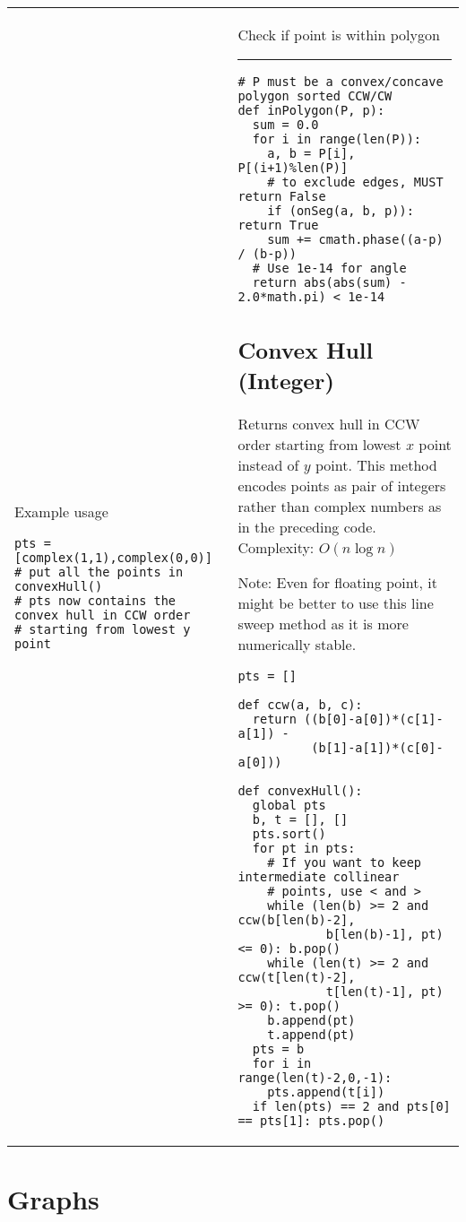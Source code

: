 \documentclass[letterpaper]{article}
\newcommand{\rx}[1]{#1\hrule}
\begin{document}
\begin{tabular}{@{}p{9cm}p{9cm}@{}}
    Example usage
    \begin{lstlisting}
pts = [complex(1,1),complex(0,0)] # put all the points in
convexHull()
# pts now contains the convex hull in CCW order
# starting from lowest y point
\end{lstlisting}
     &
    \rx{Check if point is within polygon}
    \begin{lstlisting}
# P must be a convex/concave polygon sorted CCW/CW
def inPolygon(P, p):
  sum = 0.0
  for i in range(len(P)):
    a, b = P[i], P[(i+1)%len(P)]
    # to exclude edges, MUST return False
    if (onSeg(a, b, p)): return True
    sum += cmath.phase((a-p) / (b-p))
  # Use 1e-14 for angle
  return abs(abs(sum) - 2.0*math.pi) < 1e-14
\end{lstlisting}

    \subsection{Convex Hull (Integer)}

    Returns convex hull in CCW order starting from lowest $x$ point instead of $y$
    point. This method encodes points as pair of integers rather than complex
    numbers as in the preceding code. Complexity: $O\left(n\log n\right)$

    Note: Even for floating point, it might be better to use this line sweep method as it is more numerically stable.

    \begin{lstlisting}
pts = []

def ccw(a, b, c):
  return ((b[0]-a[0])*(c[1]-a[1]) -
          (b[1]-a[1])*(c[0]-a[0]))

def convexHull():
  global pts
  b, t = [], []
  pts.sort()
  for pt in pts:
    # If you want to keep intermediate collinear
    # points, use < and >
    while (len(b) >= 2 and ccw(b[len(b)-2],
            b[len(b)-1], pt) <= 0): b.pop()
    while (len(t) >= 2 and ccw(t[len(t)-2],
            t[len(t)-1], pt) >= 0): t.pop()
    b.append(pt)
    t.append(pt)
  pts = b
  for i in range(len(t)-2,0,-1):
    pts.append(t[i])
  if len(pts) == 2 and pts[0] == pts[1]: pts.pop()
\end{lstlisting}
\end{tabular}

\clearpage

\section{Graphs}
\end{document}

